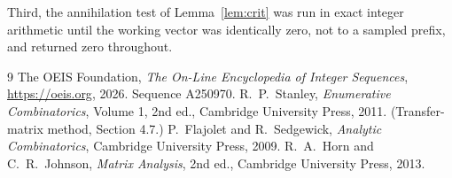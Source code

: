 \documentclass[11pt,a4paper]{article}
\theoremstyle{plain}
\theoremstyle{definition}
\begin{document}
Third, the annihilation test of Lemma~\ref{lem:crit} was run in exact integer arithmetic
until the working vector was identically zero, not to a sampled prefix, and returned zero
throughout.

\begin{thebibliography}{9}
 The OEIS Foundation, \emph{The On-Line Encyclopedia of Integer
Sequences}, \url{https://oeis.org}, 2026. Sequence A250970.
 R.~P.~Stanley, \emph{Enumerative Combinatorics}, Volume 1, 2nd ed.,
Cambridge University Press, 2011. (Transfer-matrix method, Section 4.7.)
 P.~Flajolet and R.~Sedgewick, \emph{Analytic Combinatorics}, Cambridge
University Press, 2009.
 R.~A.~Horn and C.~R.~Johnson, \emph{Matrix Analysis}, 2nd ed., Cambridge
University Press, 2013.
\end{thebibliography}
\end{document}
